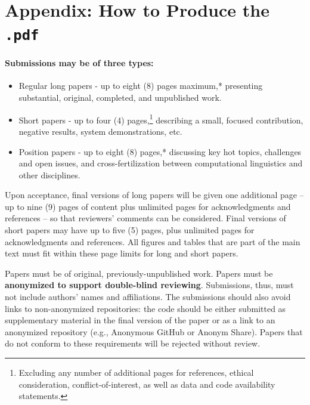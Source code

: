 \documentclass[10pt, a4paper]{article}
\begin{document}




\newpage
\appendix

\section{Appendix: How to Produce the \texttt{.pdf}}%
\label{sec:append-how-prod}

\paragraph{Submissions may be of three types:}

\begin{itemize}
\item Regular long papers - up to eight (8) pages maximum,* presenting substantial, original, completed, and unpublished work.
\item Short papers - up to four (4) pages,\footnote{Excluding any number of additional pages for references, ethical consideration, conflict-of-interest, as well as data and code availability statements.} describing a small, focused contribution, negative results, system demonstrations, etc.
\item  Position papers - up to eight (8) pages,* discussing key hot topics, challenges and open issues, and cross-fertilization between computational linguistics and other disciplines.
\end{itemize}

Upon acceptance, final versions of long papers will be given one
additional page – up to nine (9) pages of content plus unlimited pages for acknowledgments and references – so that reviewers’ comments can be considered. Final versions of short papers may have up to five (5) pages, plus unlimited pages for acknowledgments and references. All figures and tables that are part of the main text must fit within these page limits for long and short papers.

Papers must be of original, previously-unpublished work. Papers must be \textbf{anonymized to support double-blind reviewing}. Submissions, thus, must not include authors’ names and affiliations. The submissions should also avoid links to non-anonymized repositories: the code should be either submitted as supplementary material in the final version of the paper or as a link to an anonymized repository (e.g., Anonymous GitHub or Anonym Share). Papers that do not conform to these requirements will be rejected without review.
\end{document}
